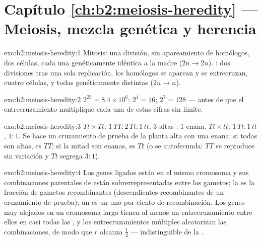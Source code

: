 \section*{Capítulo \ref{ch:b2:meiosis-heredity} --- Meiosis, mezcla genética y herencia}

\begin{solution}{exo:b2:meiosis-heredity:1}
Mitosis: una división, sin apareamiento de homólogos, dos células, cada
una genéticamente idéntica a la madre ($2n \to 2n$). : dos
divisiones tras una sola replicación, los homólogos se aparean y se
entrecruzan, cuatro células,  y todas genéticamente distintas
($2n \to n$).
\end{solution}

\begin{solution}{exo:b2:meiosis-heredity:2}
$2^{23} = 8.4\times 10^{6}$; $2^{4} = 16$; $2^{7} = 128$ --- antes de
que el entrecruzamiento multiplique cada una de estas cifras sin límite.
\end{solution}

\begin{solution}{exo:b2:meiosis-heredity:3}
$Tt\times Tt$:  $1\,TT : 2\,Tt : 1\,tt$,  $3$ altas
: $1$ enana. $Tt\times tt$: $1\,Tt : 1\,tt$, $1 : 1$. Se hace un
cruzamiento de prueba de la planta alta con una enana: si todas son
altas, es $TT$; si la mitad son enanas, es $Tt$ (o se autofecunda: $TT$
se reproduce sin variación y $Tt$ segrega $3 : 1$).
\end{solution}

\begin{solution}{exo:b2:meiosis-heredity:4}
Los genes ligados están en el mismo cromosoma y sus combinaciones
parentales de  están sobrerrepresentadas entre los gametos; la
 es la fracción de gametos recombinantes
(descendientes recombinantes de un cruzamiento de prueba); un 
es un uno por ciento de recombinación. Los genes muy alejados en un
cromosoma largo tienen al menos un entrecruzamiento entre ellos en casi
todas las , y los entrecruzamientos múltiples aleatorizan las
combinaciones, de modo que $r$ alcanza $\tfrac12$ --- indistinguible de
la .
\end{solution}

